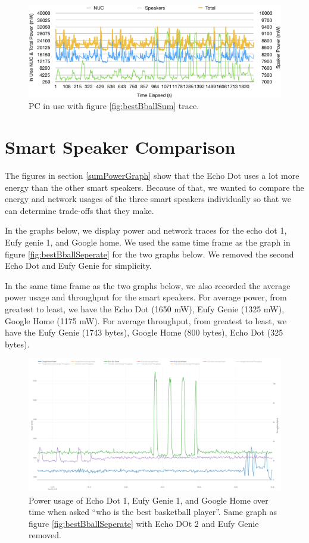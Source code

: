 \begin{figure}[H]
  \centering
  \includegraphics[width=1\textwidth]{figures/nucInUse.png}
  \caption{PC in use with figure \ref{fig:bestBballSum} trace.}
  \label{fig:nucInUse}
\end{figure}

\section{Smart Speaker Comparison}
\label{smartSpeakerComparisonSection}
The figures in section \ref{sumPowerGraph} show that the Echo Dot uses a lot more energy than the other smart speakers. Because of that, we wanted to compare the energy and network usages of the three smart speakers individually so that we can determine trade-offs that they make.

In the graphs below, we display power and network traces for the echo dot 1, Eufy genie 1, and Google home. We used the same time frame as the graph in figure \ref{fig:bestBballSeperate} for the two graphs below. We removed the second Echo Dot and Eufy Genie for simplicity.

In the same time frame as the two graphs below, we also recorded the average power usage and throughput for the smart speakers. For average power, from greatest to least, we have the Echo Dot (1650 mW), Eufy Genie (1325 mW), Google Home (1175 mW). For average throughput, from greatest to least, we have the Eufy Genie (1743 bytes), Google Home (800 bytes), Echo Dot (325 bytes).

\begin{figure}[H]
  \centering
  \includegraphics[width=1\textwidth]{figures/smartSpeakerSeperate.png}
  \caption{Power usage of Echo Dot 1, Eufy Genie 1, and Google Home over time when asked ``who is the best basketball player''. Same graph as figure \ref{fig:bestBballSeperate} with Echo DOt 2 and Eufy Genie removed.}
  \label{fig:smartSpeakerSeperate}
\end{figure}

